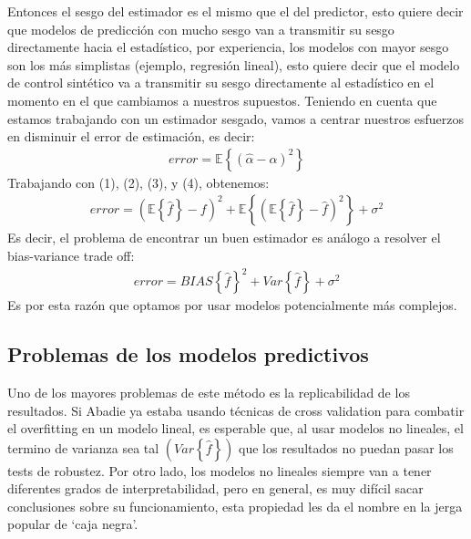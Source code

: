 \documentclass[12pt]{article}
\begin{document}
Entonces el sesgo del estimador es el mismo que el del predictor, esto quiere decir que modelos de predicción con mucho sesgo van a transmitir su sesgo directamente hacia el estadístico, por experiencia, los modelos con mayor sesgo son los más simplistas (ejemplo, regresión lineal), esto quiere decir que el modelo de control sintético va a transmitir su sesgo directamente al estadístico en el momento en el que cambiamos a nuestros supuestos. 
Teniendo en cuenta que estamos trabajando con un estimador sesgado, vamos a centrar nuestros esfuerzos en disminuir el error de estimación, es decir:
\begin{align*}
    error=\mathbb{E}\left\{\left(\hat{\alpha}-\alpha\right)^2\right\}
\end{align*}
Trabajando con (1), (2), (3), y (4), obtenemos:
\begin{align*}
    error=\left(\mathbb{E}\left\{\hat{f}\right\}-f\right)^2+\mathbb{E}\left\{\left(\mathbb{E}\left\{\hat{f}\right\}-\hat{f}\right)^2\right\}+\sigma^2
\end{align*}
Es decir, el problema de encontrar un buen estimador es análogo a resolver el bias-variance trade off:
\begin{align*}
    error={BIAS\left\{\hat{f}\right\}}^2+Var\left\{\hat{f}\right\}+\sigma^2
\end{align*}
Es por esta razón que optamos por usar modelos potencialmente más complejos.

\subsection{Problemas de los modelos predictivos}
Uno de los mayores problemas de este método es la replicabilidad de los resultados. Si Abadie ya estaba usando técnicas de cross validation para combatir el overfitting en un modelo lineal, es esperable que, al usar modelos no lineales, el termino de varianza sea tal {$ (Var\left\{\hat{f}\right\}) $} que los resultados no puedan pasar los tests de robustez.
Por otro lado, los modelos no lineales siempre van a tener diferentes grados de interpretabilidad, pero en general, es muy difícil sacar conclusiones sobre su funcionamiento, esta propiedad les da el nombre en la jerga popular de ‘caja negra’.
\end{document}
